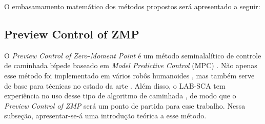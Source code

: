 





O embasamamento matemático dos métodos propostos será apresentado a seguir:


\subsection{Preview Control of ZMP}

O \emph{Preview Control of Zero-Moment Point} é um método seminalalítico de controle de caminhada bípede baseado em \emph{Model Predictive Control} (MPC) \cite{kajita2003}. Não apenas esse método foi implementado em vários robôs humanoides \cite{yi2016}, mas  também serve de base para técnicas no estado da arte \cite{tesemarcos,herdt2010}. Além disso, o LAB-SCA tem experiência no uso desse tipo de algoritmo de caminhada \cite{max22,tesemarcos}, de modo que o \emph{Preview Control of ZMP} será um ponto de partida para esse trabalho. Nessa subseção, apresentar-se-á uma introdução teórica a esse método.

